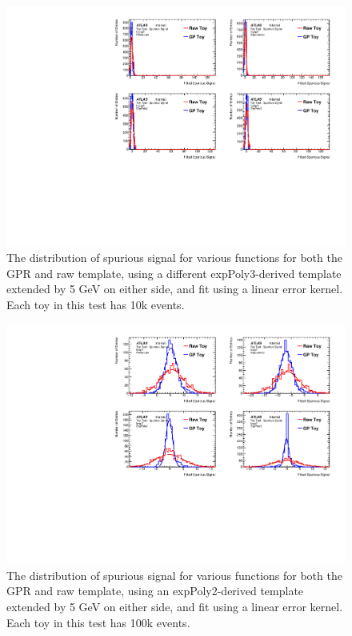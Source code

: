 \begin{figure} 
\begin{center}
  \includegraphics[width=\textwidth]{figures/background/gpr/validation/linear/ToyTest_FitSigVals_highpT_10k_noSig}   
\caption{The distribution of spurious signal for various functions for both the GPR and raw template, using a different expPoly3-derived template extended by 5 GeV on either side, and fit using a linear error kernel. Each toy in this test has 10k events.}
\label{fig:linearkernel_highpt_10k_noSig}
\end{center}
\end{figure}

\begin{figure} 
\begin{center}
  \includegraphics[width=\textwidth]{figures/background/gpr/validation/linear/ToyTest_FitSigVals_lowpT_100k_noSig}   
\caption{The distribution of spurious signal for various functions for both the GPR and raw template, using an expPoly2-derived template extended by 5 GeV on either side, and fit using a linear error kernel. Each toy in this test has 100k events.}
\label{fig:linearkernel_lowpt_100k_noSig}
\end{center}
\end{figure}

